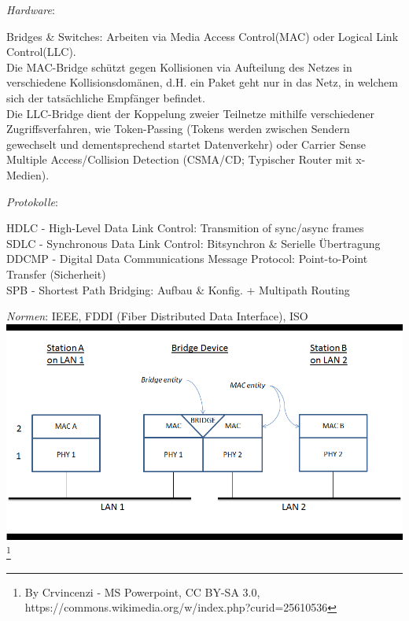 \documentclass[11pt]{article}
\begin{document}
\begin{enumerate}
        \emph{Hardware}:
        \begin{addmargin}[1em]{1em} %
            Bridges \& Switches: Arbeiten via Media Access Control(MAC) oder Logical Link Control(LLC).\\
            Die MAC-Bridge schützt gegen Kollisionen via Aufteilung des Netzes in verschiedene Kollisionsdomänen, d.H.
            ein Paket geht nur in das Netz, in welchem sich der tatsächliche Empfänger befindet.\\
            Die LLC-Bridge dient der Koppelung zweier Teilnetze mithilfe verschiedener Zugriffsverfahren, wie
            Token-Passing (Tokens werden zwischen Sendern gewechselt und dementsprechend startet Datenverkehr) oder
            Carrier Sense Multiple Access/Collision Detection (CSMA/CD; Typischer Router mit x-Medien).\\
        \end{addmargin}

        \emph{Protokolle}:
        \begin{addmargin}[1em]{1em}
            HDLC - High-Level Data Link Control: Transmition of sync/async frames\\
            SDLC - Synchronous Data Link Control: Bitsynchron \& Serielle Übertragung\\
            DDCMP - Digital Data Communications Message Protocol: Point-to-Point Transfer (Sicherheit)\\
            SPB - Shortest Path Bridging: Aufbau \& Konfig. + Multipath Routing\\
        \end{addmargin}
        \emph{Normen}: IEEE, FDDI (Fiber Distributed Data Interface), ISO\\

        \includegraphics[width=\textwidth]{Network_Bridging.png}
        \footnote[1\small \emph{Schemata of Bridge/Switch inside a Network}]{By Crvincenzi - MS Powerpoint, CC BY-SA 3.0, https://commons.wikimedia.org/w/index.php?curid=25610536}


\end{enumerate}
\end{document}
